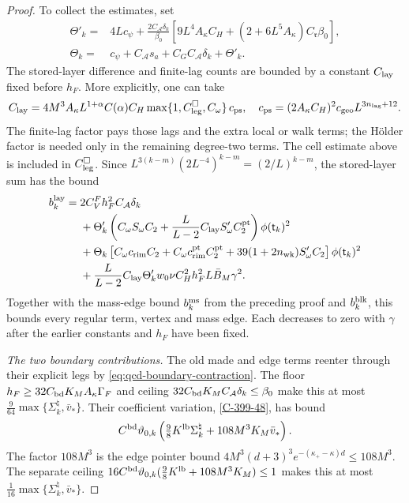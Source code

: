 \documentclass[11pt,letterpaper,reqno]{amsart}
\theoremstyle{definition}
\theoremstyle{remark}
\begin{document}
\begin{proof}
To collect the estimates, set
\[
\begin{split}
 \Theta'_k={}&4Lc_\psi+
 \frac{2C_{\mathcal A}\delta_k}{\beta_0}
 [9L^4A_\kappa C_H+(2+6L^5A_\kappa)C_{\mathfrak r}\beta_0],\\
 \Theta_k={}&c_\psi+C_{\mathcal A}s_a+
                           C_GC_{\mathcal A}\delta_k+\Theta'_k.
\end{split}
\]
The stored-layer difference and finite-lag counts
are bounded by a constant $C_{\rm lay}$ fixed
before $h_F$. More explicitly, one can take
\[
 C_{\rm lay}
 =4M^3A_\kappa L^{1+\alpha}C(\alpha)C_H
       \max\{1,C_{\rm leg}^{\square},C_\omega\}\,c_{\rm ps},
 \quad
 c_{\rm ps}=(2A_\kappa C_H)^2c_{\rm geo}
                                  L^{3n_{\rm lag}+12}.
\]
The finite-lag factor pays those lags and the
extra local or walk terms; the H\"older factor
is needed only in the remaining degree-two
terms. The cell estimate above is included
in $C_{\rm leg}^{\square}$.
Since $L^{3(k-m)}(2L^{-4})^{k-m}=(2/L)^{k-m}$,
the stored-layer sum has the bound
\[
\begin{split}
 b_k^{\rm lay}={}&2C_V^Fh_F^2C_{\mathcal A}\delta_k\\
 &+\Theta'_k
 \left(C_\omega S_\omega C_2+
       \frac{L}{L-2}C_{\rm lay}S'_\omega C_2^{\rm pt}\right)
                                  \phi(\mathsf t_k)^2\\
 &+\Theta_k\left[
 C_\omega c_{\rm rim}C_2+C_\omega c_{\rm rim}^{\rm pt}C_2^{\rm pt}
              +39(1+2n_{\rm wk})S'_\omega C_2\right]
                                  \phi(\mathsf t_k)^2\\
 &+\frac L{L-2}C_{\rm lay}\Theta'_k
                     w_0\nu C_H^2h_F^2L\bar B_M\gamma^2 .
\end{split}
\]
Together with the mass-edge bound $b_k^{\rm ms}$
from the preceding proof and $b_k^{\rm blk}$,
this bounds every regular term, vertex and
mass edge. Each decreases to zero with
$\gamma$ after the earlier constants and
$h_F$ have been fixed.

\emph{The two boundary contributions.}
The old made and edge terms reenter through
their explicit legs by
\eqref{eq:qcd-boundary-contraction}.
The floor $h_F\ge32C_{\rm bd}K_MA_\kappa\Gamma_F$
and ceiling
$32C_{\rm bd}K_MC_{\mathcal A}\delta_k\le\beta_0$
make this at most
$\frac9{64}\max\{\Sigma_k^\natural,\bar v_*\}$.
Their coefficient variation, \cref{C-399-48},
has bound
\[
 C^{\rm bd}\vartheta_{0,k}
  \left(\tfrac98K^{\rm lb}\Sigma_k^\natural
                       +108M^3K_M\bar v_*\right).
\]
The factor $108M^3$ is the edge pointer bound
$4M^3(d+3)^3e^{-(\kappa_+-\kappa)d}\le108M^3$.
The separate ceiling
$16C^{\rm bd}\vartheta_{0,k}
(\frac98K^{\rm lb}+108M^3K_M)\le1$
makes this at most
$\frac1{16}\max\{\Sigma_k^\natural,\bar v_*\}$.


\end{proof}
\end{document}
